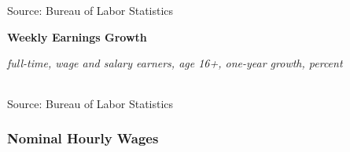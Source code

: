 \documentclass{report}
\makeatletter
\newcommand{\tbllink}[1]{\href{https://raw.githubusercontent.com/bdecon/US-chartbook/master/chartbook/data/#1}{\faTable}}
\newcommand*\short[1]{\expandafter\@gobbletwo\number\numexpr#1\relax}
\newcommand{\dateaxisticks}{
		date coordinates in=x, axis line style={draw=none},
		xmax={2020-08-10},
		max space between ticks=40,	    
		xtick={{1990-01-01}, {1992-01-01}, {1994-01-01}, 
			{1996-01-01}, {1998-01-01}, {2000-01-01}, 
			{2002-01-01}, {2004-01-01}, {2006-01-01},
			{2008-01-01}, {2010-01-01}, {2012-01-01}, {2014-01-01},
		    {2016-01-01}, {2018-01-01}, {2020-01-01}},
		minor xtick={{1989-01-01}, {1991-01-01}, {1993-01-01},
			{1995-01-01}, {1997-01-01}, {1999-01-01}, 
			{2001-01-01}, {2003-01-01}, {2005-01-01}, {2007-01-01},
		    {2009-01-01}, {2011-01-01}, {2013-01-01}, {2015-01-01},
		    {2017-01-01}, {2019-01-01}},
		enlarge y limits={0.06}, enlarge x limits={0.01},
		}
\newcommand{\bbar}[2]{extra #1 ticks = {{#2}}, extra #1 tick labels = ,
		extra #1 tick style = {grid=major, grid style={thick, black!25}},}
\newcommand{\stdline}[4]{\addplot[very thick, no markers, color=#1] 
		table [x=#2, y=#3, col sep=comma] {#4};	}
\newcommand{\rbars}{
		\fill[color=black!10] (axis cs:{1990-07-01},\pgfkeysvalueof{/pgfplots/ymin}) rectangle 
			(axis cs:{1991-03-01}, \pgfkeysvalueof{/pgfplots/ymax});
		\fill[color=black!10] (axis cs:{2007-12-01},\pgfkeysvalueof{/pgfplots/ymin}) rectangle 
			(axis cs:{2009-07-01}, \pgfkeysvalueof{/pgfplots/ymax});
		\fill[color=black!10] (axis cs:{2001-03-01},\pgfkeysvalueof{/pgfplots/ymin}) rectangle 
			(axis cs:{2001-11-01}, \pgfkeysvalueof{/pgfplots/ymax});
		\fill[color=black!10] (axis cs:{2020-02-01},\pgfkeysvalueof{/pgfplots/ymin}) rectangle 
			(axis cs:{2020-09-01}, \pgfkeysvalueof{/pgfplots/ymax});}
\makeatother
\begin{document}
{{{{{{{{{\begin{minipage}{0.76\textwidth}
\footnotesize{Source: Bureau of Labor Statistics}

\vspace{6mm}

\normalsize \textbf{Weekly Earnings Growth}

\footnotesize{\textit{full-time, wage and salary earners, age 16+, one-year growth, percent}}

\hspace*{-3mm}  \setlength{\tabcolsep}{3.1pt} \color{black!90}
		{\renewcommand{\arraystretch}{1.55}
		 \begin{tabular}{p{19mm} R{8.8mm} R{8.8mm} R{8.8mm} R{8.8mm} R{8.8mm} R{8.8mm} 
		   R{8.8mm} R{8.8mm} R{8.8mm} R{8.8mm}}
			 \hline
		\end{tabular}}
\vspace{1mm}
		
\footnotesize{Source: Bureau of Labor Statistics}







\end{minipage}

\newpage

\subsubsection*{\color{black!70} \seriffont Nominal Hourly Wages}

\begin{minipage}{0.76\textwidth}

\small \\


\end{minipage}}}}}}}}}}
\end{document}
